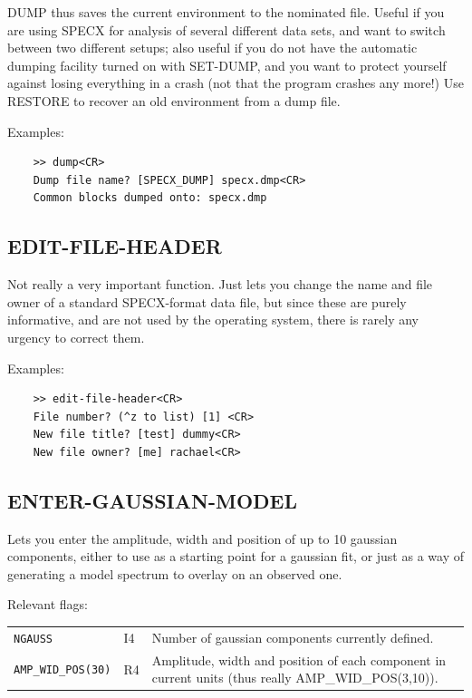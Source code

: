 \documentclass[11pt,twoside]{report}
\begin{document}
DUMP thus saves the current environment  to the
nominated file. Useful if you are using SPECX for analysis of several different
data sets, and want to switch between two different setups; also useful if you
do not have the automatic dumping facility turned on with SET-DUMP, and you
want to protect yourself against losing everything in a crash (not that the
program crashes any more!) Use RESTORE to recover an old environment from a
dump file. 

Examples:
\begin{verbatim}
    >> dump<CR>
    Dump file name? [SPECX_DUMP] specx.dmp<CR>
    Common blocks dumped onto: specx.dmp           
\end{verbatim}

\subsection{EDIT-FILE-HEADER} 

Not really a very important function. Just lets you change the name and
file owner of a standard SPECX-format data file, 
but since these are purely informative, and are not
used by the operating system, there is rarely any urgency to correct them. 

Examples:
\begin{verbatim}
    >> edit-file-header<CR>
    File number? (^z to list) [1] <CR>
    New file title? [test] dummy<CR>
    New file owner? [me] rachael<CR>
\end{verbatim}

\subsection{ENTER-GAUSSIAN-MODEL} 

Lets you enter the amplitude, width and position of up to 10 gaussian
components, either to use as a starting point for a gaussian fit, or just as
a way of generating a model spectrum to overlay on an observed one.

Relevant flags:\\
\begin{tabular}{lll}
  \verb+NGAUSS+         &I4 & Number of gaussian components currently defined.\\
  \verb+AMP_WID_POS(30)+&R4 & \parbox[t]{4in}
                              {Amplitude, width and position of each
                               component in current units (thus really
                               AMP\_WID\_POS(3,10)).}
\end{tabular}
\end{document}
